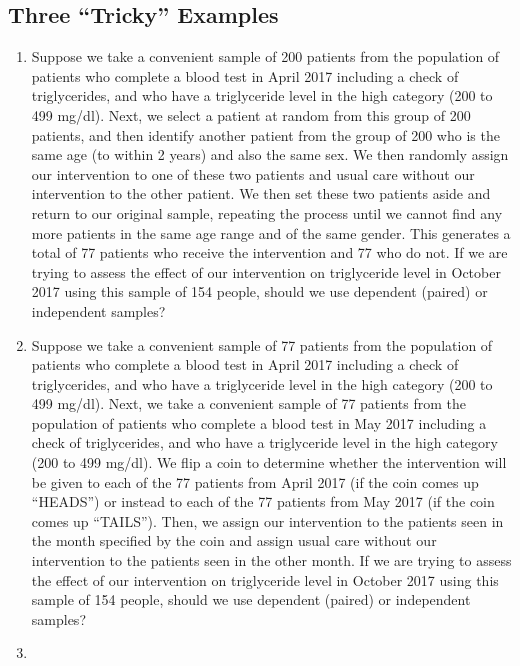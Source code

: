 \documentclass[
]{book}
\begin{document}
\hypertarget{three-tricky-examples}{%
\subsection{Three ``Tricky'' Examples}\label{three-tricky-examples}}

\begin{enumerate}
\def\labelenumi{\arabic{enumi}.}
\item
  Suppose we take a convenient sample of 200 patients from the population of patients who complete a blood test in April 2017 including a check of triglycerides, and who have a triglyceride level in the high category (200 to 499 mg/dl). Next, we select a patient at random from this group of 200 patients, and then identify another patient from the group of 200 who is the same age (to within 2 years) and also the same sex. We then randomly assign our intervention to one of these two patients and usual care without our intervention to the other patient. We then set these two patients aside and return to our original sample, repeating the process until we cannot find any more patients in the same age range and of the same gender. This generates a total of 77 patients who receive the intervention and 77 who do not. If we are trying to assess the effect of our intervention on triglyceride level in October 2017 using this sample of 154 people, should we use dependent (paired) or independent samples?
\item
  Suppose we take a convenient sample of 77 patients from the population of patients who complete a blood test in April 2017 including a check of triglycerides, and who have a triglyceride level in the high category (200 to 499 mg/dl). Next, we take a convenient sample of 77 patients from the population of patients who complete a blood test in May 2017 including a check of triglycerides, and who have a triglyceride level in the high category (200 to 499 mg/dl). We flip a coin to determine whether the intervention will be given to each of the 77 patients from April 2017 (if the coin comes up ``HEADS'') or instead to each of the 77 patients from May 2017 (if the coin comes up ``TAILS''). Then, we assign our intervention to the patients seen in the month specified by the coin and assign usual care without our intervention to the patients seen in the other month. If we are trying to assess the effect of our intervention on triglyceride level in October 2017 using this sample of 154 people, should we use dependent (paired) or independent samples?
\item

\end{enumerate}
\end{document}
